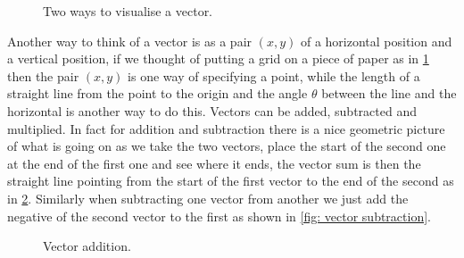 \begin{figure}[ht]
    \centering
    \caption{Two ways to visualise a vector.}
    \label{fig: vectors}
\end{figure}

Another way to think of a vector is as a pair $(x,y)$ of a horizontal position and a vertical position, if we thought of putting a grid on a piece of paper as in \cref{fig: vectors} then the pair $(x,y)$ is one way of specifying a point, while the length of a straight line from the point to the origin and the angle $\theta$ between the line and the horizontal is another way to do this. Vectors can be added, subtracted and multiplied. In fact for addition and subtraction there is a nice geometric picture of what is going on as we take the two vectors, place the start of the second one at the end of the first one and see where it ends, the vector sum is then the straight line pointing from the start of the first vector to the end of the second as in \cref{fig: vector addition}. Similarly when subtracting one vector from another we just add the negative of the second vector to the first as shown in \cref{fig: vector subtraction}.\\

\begin{figure}[ht]
    \centering
    \caption{Vector addition.}
    \label{fig: vector addition}
\end{figure}



